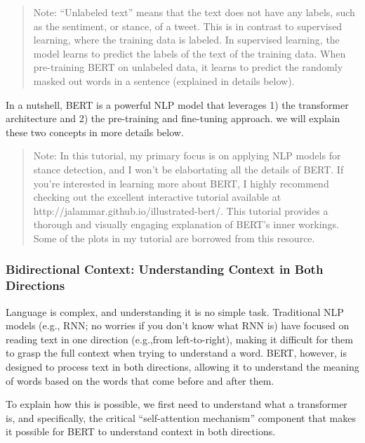 \documentclass[11pt]{article}
\begin{document}
    \begin{quote}
Note: ``Unlabeled text'' means that the text does not have any labels,
such as the sentiment, or stance, of a tweet. This is in contrast to
supervised learning, where the training data is labeled. In supervised
learning, the model learns to predict the labels of the text of the
training data. When pre-training BERT on unlabeled data, it learns to
predict the randomly masked out words in a sentence (explained in
details below).
\end{quote}

    In a nutshell, BERT is a powerful NLP model that leverages 1) the
transformer architecture and 2) the pre-training and fine-tuning
approach. we will explain these two concepts in more details below.

    \begin{quote}
Note: In this tutorial, my primary focus is on applying NLP models for
stance detection, and I won't be elabortating all the details of BERT.
If you're interested in learning more about BERT, I highly recommend
checking out the excellent interactive tutorial available at
http://jalammar.github.io/illustrated-bert/. This tutorial provides a
thorough and visually engaging explanation of BERT's inner workings.
Some of the plots in my tutorial are borrowed from this resource.
\end{quote}

    \hypertarget{bidirectional-context-understanding-context-in-both-directions}{%
\subsubsection{Bidirectional Context: Understanding Context in Both
Directions}\label{bidirectional-context-understanding-context-in-both-directions}}

Language is complex, and understanding it is no simple task. Traditional
NLP models (e.g., RNN; no worries if you don't know what RNN is) have
focused on reading text in one direction (e.g.,from left-to-right),
making it difficult for them to grasp the full context when trying to
understand a word. BERT, however, is designed to process text in both
directions, allowing it to understand the meaning of words based on the
words that come before and after them.

To explain how this is possible, we first need to understand what a
transformer is, and specifically, the critical ``self-attention
mechanism'' component that makes it possible for BERT to understand
context in both directions.
\end{document}
